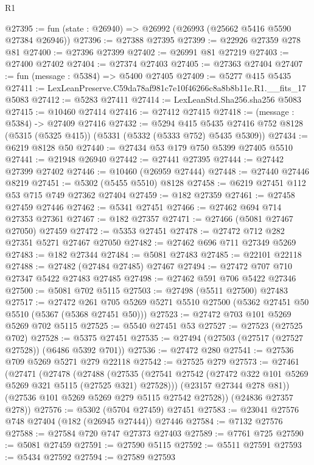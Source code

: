 \begin{lexlean}{R1}
\begin{coremodule}
@27395 := fun (state : @26940) => @26992 (@26993 (@25662 @5416 @5590 @27384 @26946))
@27396 := @27388 @27395
@27399 := @22926 @27359 @278 @81
@27400 := @27396 @27399
@27402 := @26991 @81 @27219
@27403 := @27400 @27402
@27404 := @27374 @27403
@27405 := @27363 @27404
@27407 := fun (message : @5384) => @5400 @27405
@27409 := @5277 @415 @5435
@27411 := LexLeanPreserve.C59da78af981c7e10f46266c8a8b8b11e.R1.__fits_17 @5083
@27412 := @5283 @27411
@27414 := LexLeanStd.Sha256.sha256 @5083
@27415 := @10460 @27414
@27416 := @27412 @27415
@27418 := (message : @5384) -> @27409 @27416
@27432 := @5294
    @415
    @5435
    @27416
    @752
    @8128
    (@5315 (@5325 @415))
    (@5331 (@5332 (@5333 @752) @5435 @5309))
@27434 := @6219 @8128 @50
@27440 := @27434 @53 @179 @750 @5399 @27405 @5510
@27441 := @21948 @26940
@27442 := @27441 @27395
@27444 := @27442 @27399 @27402
@27446 := @10460 (@26959 @27444)
@27448 := @27440 @27446 @8219
@27451 := @5302 (@5455 @5510) @8128
@27458 := @6219 @27451 @112 @53 @715 @749 @27362 @27404
@27459 := @182 @27359
@27461 := @27458 @27459 @27446
@27462 := @5341 @27451
@27466 := @27462 @694 @714 @27353 @27361
@27467 := @182 @27357
@27471 := @27466 (@5081 @27467 @27050) @27459
@27472 := @5353 @27451
@27478 := @27472 @712 @282 @27351 @5271 @27467 @27050
@27482 := @27462 @696 @711 @27349 @5269
@27483 := @182 @27344
@27484 := @5081 @27483
@27485 := @22101 @22118
@27488 := @27482 (@27484 @27485) @27467
@27494 := @27472 @707 @710 @27347 @5422 @27483 @27485
@27498 := @27462 @591 @706 @5422 @27346
@27500 := @5081 @702 @5115
@27503 := @27498 (@5511 @27500) @27483
@27517 := @27472
    @261
    @705
    @5269
    @5271
    @5510
    @27500
    (@5362 @27451 @50 @5510 (@5367 (@5368 @27451 @50)))
@27523 := @27472 @703 @101 @5269 @5269 @702 @5115
@27525 := @5540 @27451 @53
@27527 := @27523 (@27525 @702)
@27528 := @5375 @27451
@27535 := @27494 (@27503 (@27517 (@27527 @27528)) (@6486 @5392 @701))
@27536 := @27472 @280
@27541 := @27536 @709 @5269 @5271 @279 @22118
@27542 := @27525 @279
@27573 := @27461
    (@27471
      (@27478
        (@27488
          (@27535 (@27541 @27542 (@27472 @322 @101 @5269 @5269 @321 @5115 (@27525 @321) @27528)))
          (@23157 @27344 @278 @81))
        (@27536 @101 @5269 @5269 @279 @5115 @27542 @27528))
      (@24836 @27357 @278))
@27576 := @5302 (@5704 @27459) @27451
@27583 := @23041 @27576 @748 @27404 (@182 (@26945 @27444)) @27446
@27584 := @7132 @27576
@27588 := @27584 @720 @747 @27373 @27403
@27589 := @7761 @725
@27590 := @5081 @27459
@27591 := @27590 @5115
@27592 := @5511 @27591
@27593 := @5434 @27592
@27594 := @27589 @27593

\end{coremodule}
\end{lexlean}

